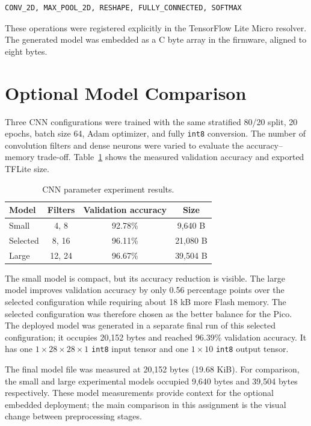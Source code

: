 \documentclass[conference]{IEEEtran}
\begin{document}
\begin{lstlisting}
CONV_2D, MAX_POOL_2D, RESHAPE, FULLY_CONNECTED, SOFTMAX
\end{lstlisting}

These operations were registered explicitly in the TensorFlow Lite Micro resolver. The generated model was embedded as a C byte array in the firmware, aligned to eight bytes.

\section{Optional Model Comparison}
Three CNN configurations were trained with the same stratified 80/20 split, 20 epochs, batch size 64, Adam optimizer, and fully \texttt{int8} conversion. The number of convolution filters and dense neurons were varied to evaluate the accuracy--memory trade-off. Table~\ref{tab:experiments} shows the measured validation accuracy and exported TFLite size.

\begin{table}[ht]
\centering
\caption{CNN parameter experiment results.}
\label{tab:experiments}
\begin{tabular}{lccc}
\toprule
Model & Filters & Validation accuracy & Size \\
\midrule
Small & 4, 8 & 92.78\% & 9,640 B \\
Selected & 8, 16 & 96.11\% & 21,080 B \\
Large & 12, 24 & 96.67\% & 39,504 B \\
\bottomrule
\end{tabular}
\end{table}

The small model is compact, but its accuracy reduction is visible. The large model improves validation accuracy by only 0.56 percentage points over the selected configuration while requiring about 18 kB more Flash memory. The selected configuration was therefore chosen as the better balance for the Pico. The deployed model was generated in a separate final run of this selected configuration; it occupies 20,152 bytes and reached 96.39\% validation accuracy. It has one $1 \times 28 \times 28 \times 1$ \texttt{int8} input tensor and one $1 \times 10$ \texttt{int8} output tensor.

The final model file was measured at 20,152 bytes (19.68 KiB). For comparison, the small and large experimental models occupied 9,640 bytes and 39,504 bytes respectively. These model measurements provide context for the optional embedded deployment; the main comparison in this assignment is the visual change between preprocessing stages.
\end{document}
